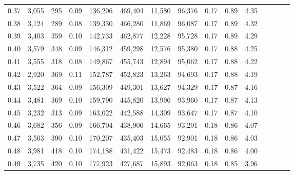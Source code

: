 \begin{tabular}{rrrcrrrrrrrrrrr}
0.37 &   3,055 &     295 &                                       0.09 &  136,206 &  469,404 &   11,580 &   96,376 &  0.17 &  0.89 &                         4.35 \\
0.38 &   3,124 &     289 &                                       0.08 &  139,330 &  466,280 &   11,869 &   96,087 &  0.17 &  0.89 &                         4.32 \\
0.39 &   3,403 &     359 &                                       0.10 &  142,733 &  462,877 &   12,228 &   95,728 &  0.17 &  0.89 &                         4.29 \\
0.40 &   3,579 &     348 &                                       0.09 &  146,312 &  459,298 &   12,576 &   95,380 &  0.17 &  0.88 &                         4.25 \\
0.41 &   3,555 &     318 &                                       0.08 &  149,867 &  455,743 &   12,894 &   95,062 &  0.17 &  0.88 &                         4.22 \\
0.42 &   2,920 &     369 &                                       0.11 &  152,787 &  452,823 &   13,263 &   94,693 &  0.17 &  0.88 &                         4.19 \\
0.43 &   3,522 &     364 &                                       0.09 &  156,309 &  449,301 &   13,627 &   94,329 &  0.17 &  0.87 &                         4.16 \\
0.44 &   3,481 &     369 &                                       0.10 &  159,790 &  445,820 &   13,996 &   93,960 &  0.17 &  0.87 &                         4.13 \\
0.45 &   3,232 &     313 &                                       0.09 &  163,022 &  442,588 &   14,309 &   93,647 &  0.17 &  0.87 &                         4.10 \\
0.46 &   3,682 &     356 &                                       0.09 &  166,704 &  438,906 &   14,665 &   93,291 &  0.18 &  0.86 &                         4.07 \\
0.47 &   3,503 &     390 &                                       0.10 &  170,207 &  435,403 &   15,055 &   92,901 &  0.18 &  0.86 &                         4.03 \\
0.48 &   3,981 &     418 &                                       0.10 &  174,188 &  431,422 &   15,473 &   92,483 &  0.18 &  0.86 &                         4.00 \\
0.49 &   3,735 &     420 &                                       0.10 &  177,923 &  427,687 &   15,893 &   92,063 &  0.18 &  0.85 &                         3.96 \\

\end{tabular}
